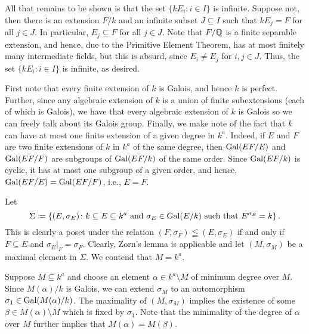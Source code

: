 \begin{exercise}
\begin{enumerate}[label=(\alph*)]
All that remains to be shown is that the set $\{kE_i\colon i\in I\}$ is infinite. Suppose not, then there is an extension $F/k$ and an infinite subset $J\subseteq I$ such that $kE_j = F$ for all $j\in J$. In particular, $E_j\subseteq F$ for all $j\in J$. Note that $F/\mathbb{Q}$ is a finite separable extension, and hence, due to the Primitive Element Theorem, has at most finitely many intermediate fields, but this is absurd, since $E_i\ne E_j$ for $i,j\in J$. Thus, the set $\{kE_i\colon i\in I\}$ is infinite, as desired.
\end{enumerate}
\end{exercise}


\setcounter{exercise}{24}

\begin{exercise}
    First note that every finite extension of $k$ is Galois, and hence $k$ is perfect. Further, since any algebraic extension of $k$ is a union of finite subextensions (each of which is Galois), we have that every algebraic extension of $k$ is Galois so we can freely talk about its Galois group. Finally, we make note of the fact that $k$ can have at most one finite extension of a given degree in $k^a$. Indeed, if $E$ and $F$ are two finite extensions of $k$ in $k^a$ of the same degree, then $\operatorname{Gal}(EF/E)$ and $\operatorname{Gal}(EF/F)$ are subgroups of $\operatorname{Gal}(EF/k)$ of the same order. Since $\operatorname{Gal}(EF/k)$ is cyclic, it has at most one subgroup of a given order, and hence, $\operatorname{Gal}(EF/E) = \operatorname{Gal}(EF/F)$, i.e., $E = F$.
    
    Let 
    \begin{equation*}
        \Sigma \coloneq \left\{(E, \sigma_E)\colon k\subseteq E\subseteq k^a\text{ and }\sigma_E\in\operatorname{Gal}(E/k)\text{ such that } E^{\sigma_E} = k\right\}.
    \end{equation*}
    This is clearly a poset under the relation $(F,\sigma_F)\leqq(E,\sigma_E)$ if and only if $F\subseteq E$ and $\sigma_E|_F = \sigma_F$. Clearly, Zorn's lemma is applicable and let $(M,\sigma_M)$ be a maximal element in $\Sigma$. We contend that $M = k^a$. 

    Suppose $M\subsetneq k^a$ and choose an element $\alpha\in k^a\setminus M$ of minimum degree over $M$. Since $M(\alpha)/k$ is Galois, we can extend $\sigma_M$ to an automorphism $\sigma_1\in\operatorname{Gal}(M(\alpha)/k)$. The maximality of $(M,\sigma_M)$ implies the existence of some $\beta\in M(\alpha)\setminus M$ which is fixed by $\sigma_1$. Note that the minimality of the degree of $\alpha$ over $M$ further implies that $M(\alpha) = M(\beta)$.


\end{exercise}
